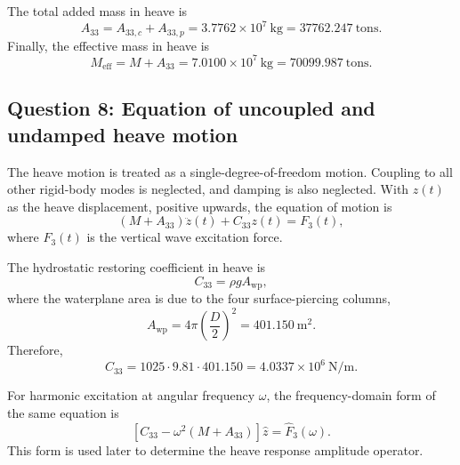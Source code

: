 The total added mass in heave is
\[
    A_{33} = A_{33,c} + A_{33,p}
    = 3.7762 \times 10^7~\mathrm{kg}
    = 37762.247~\mathrm{tons}.
\]
Finally, the effective mass in heave is
\[
    M_{\mathrm{eff}} = M + A_{33}
    = 7.0100 \times 10^7~\mathrm{kg}
    = 70099.987~\mathrm{tons}.
\]

\subsection*{Question 8: Equation of uncoupled and undamped heave motion}

The heave motion is treated as a single-degree-of-freedom motion. Coupling to all
other rigid-body modes is neglected, and damping is also neglected. With \(z(t)\)
as the heave displacement, positive upwards, the equation of motion is
\[
    \left(M + A_{33}\right)\ddot{z}(t) + C_{33} z(t) = F_3(t),
\]
where \(F_3(t)\) is the vertical wave excitation force.

The hydrostatic restoring coefficient in heave is
\[
    C_{33} = \rho g A_{\mathrm{wp}},
\]
where the waterplane area is due to the four surface-piercing columns,
\[
    A_{\mathrm{wp}}
    = 4 \pi \left(\frac{D}{2}\right)^2
    = 401.150~\mathrm{m^2}.
\]
Therefore,
\[
    C_{33}
    = 1025 \cdot 9.81 \cdot 401.150
    = 4.0337 \times 10^6~\mathrm{N/m}.
\]

For harmonic excitation at angular frequency \(\omega\), the frequency-domain
form of the same equation is
\[
    \left[C_{33} - \omega^2\left(M + A_{33}\right)\right]\hat{z}
    = \hat{F}_3(\omega).
\]
This form is used later to determine the heave response amplitude operator.

